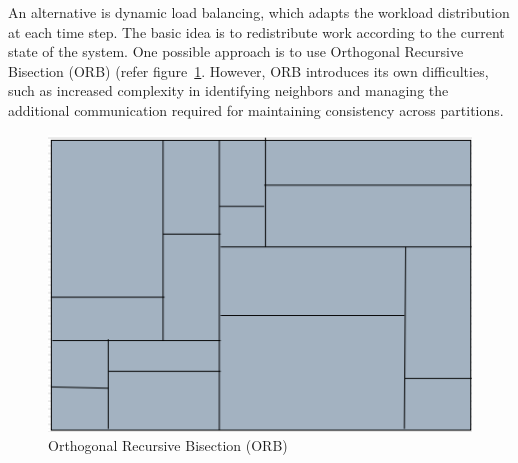 \documentclass[12pt]{book}
\begin{document}
An alternative is dynamic load balancing, which adapts the workload distribution at each time step. The basic idea is to redistribute work according to the current state of the system. One possible approach is to use Orthogonal Recursive Bisection (ORB) (refer figure~\ref{fig:ORBfig}. However, ORB introduces its own difficulties, such as increased complexity in identifying neighbors and managing the additional communication required for maintaining consistency across partitions.

\begin{figure}[ht]
    \centering
    \includegraphics[width=0.5\linewidth]{images/ORBfig.png}
    \caption{Orthogonal Recursive Bisection (ORB)}
    \label{fig:ORBfig}
\end{figure}



\end{document}
